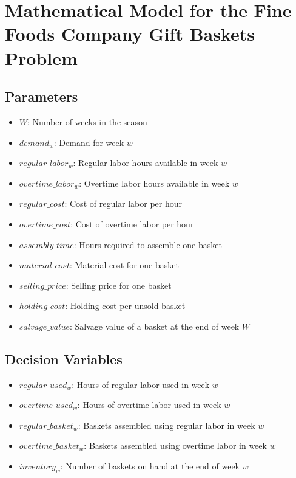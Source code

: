 \documentclass{article}
\begin{document}
\section*{Mathematical Model for the Fine Foods Company Gift Baskets Problem}

\subsection*{Parameters}
\begin{itemize}
    \item $W$: Number of weeks in the season
    \item $demand_w$: Demand for week $w$
    \item $regular\_labor_w$: Regular labor hours available in week $w$
    \item $overtime\_labor_w$: Overtime labor hours available in week $w$
    \item $regular\_cost$: Cost of regular labor per hour
    \item $overtime\_cost$: Cost of overtime labor per hour
    \item $assembly\_time$: Hours required to assemble one basket
    \item $material\_cost$: Material cost for one basket
    \item $selling\_price$: Selling price for one basket
    \item $holding\_cost$: Holding cost per unsold basket
    \item $salvage\_value$: Salvage value of a basket at the end of week $W$
\end{itemize}

\subsection*{Decision Variables}
\begin{itemize}
    \item $regular\_used_w$: Hours of regular labor used in week $w$
    \item $overtime\_used_w$: Hours of overtime labor used in week $w$
    \item $regular\_basket_w$: Baskets assembled using regular labor in week $w$
    \item $overtime\_basket_w$: Baskets assembled using overtime labor in week $w$
    \item $inventory_w$: Number of baskets on hand at the end of week $w$
\end{itemize}
\end{document}
